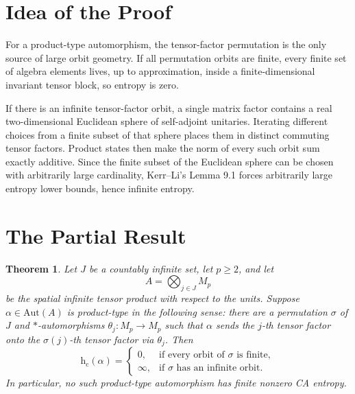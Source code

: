 \documentclass[11pt]{article}
\newtheorem{theorem}{Theorem}
\newcommand{\hc}{\mathrm{h}_{\mathrm c}}
\newcommand{\Aut}{\mathrm{Aut}}
\begin{document}
\section*{Idea of the Proof}

For a product-type automorphism, the tensor-factor permutation is the only
source of large orbit geometry. If all permutation orbits are finite, every
finite set of algebra elements lives, up to approximation, inside a
finite-dimensional invariant tensor block, so entropy is zero.

If there is an infinite tensor-factor orbit, a single matrix factor contains a
real two-dimensional Euclidean sphere of self-adjoint unitaries. Iterating
different choices from a finite subset of that sphere places them in distinct
commuting tensor factors. Product states then make the norm of every such
orbit sum exactly additive. Since the finite subset of the Euclidean sphere can
be chosen with arbitrarily large cardinality, Kerr--Li's Lemma 9.1 forces
arbitrarily large entropy lower bounds, hence infinite entropy.

\section*{The Partial Result}

\begin{theorem}
Let \(J\) be a countably infinite set, let \(p\geq 2\), and let
\[
  A=\bigotimes_{j\in J} M_p
\]
be the spatial infinite tensor product with respect to the units. Suppose
\(\alpha\in\Aut(A)\) is product-type in the following sense: there are a
permutation \(\sigma\) of \(J\) and \(*\)-automorphisms
\(\theta_j:M_p\to M_p\) such that \(\alpha\) sends the \(j\)-th tensor factor
onto the \(\sigma(j)\)-th tensor factor via \(\theta_j\). Then
\[
  \hc(\alpha)=
  \begin{cases}
  0, & \text{if every orbit of }\sigma\text{ is finite},\\
  \infty, & \text{if }\sigma\text{ has an infinite orbit}.
  \end{cases}
\]
In particular, no such product-type automorphism has finite nonzero CA
entropy.
\end{theorem}
\end{document}

